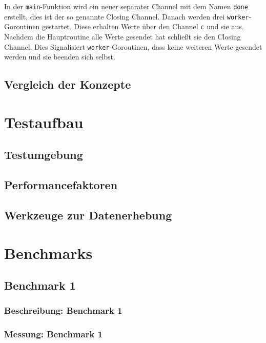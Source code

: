 \documentclass[fontsize=12pt,paper=a4,twoside=semi,parskip=half-,headsepline,headinclude]{scrreprt}
\begin{document}
In der \texttt{main}-Funktion wird ein neuer separater Channel mit dem Namen \texttt{done} erstellt, dies ist der so genannte Closing Channel. Danach werden drei \texttt{worker}-Goroutinen gestartet. Diese erhalten Werte über den Channel \texttt{c} und sie aus. Nachdem die Hauptroutine alle Werte gesendet hat schließt sie den Closing Channel. Dies Signalisiert \texttt{worker}-Goroutinen, dass keine weiteren Werte gesendet werden und sie beenden sich selbst.


\section{Vergleich der Konzepte}



\chapter{Testaufbau}

\section{Testumgebung}

\section{Performancefaktoren}

\section{Werkzeuge zur Datenerhebung}

\chapter{Benchmarks}

\section{Benchmark 1}

\subsection{Beschreibung: Benchmark 1}

\subsection{Messung: Benchmark 1}
\end{document}

